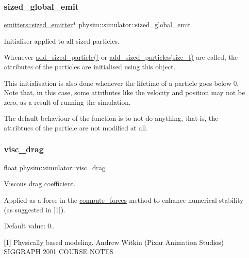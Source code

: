 \subsubsection{\texorpdfstring{sized\+\_\+global\+\_\+emit}{sized\_global\_emit}}
{\footnotesize\ttfamily \hyperlink{classphysim_1_1emitters_1_1sized__emitter}{emitters\+::sized\+\_\+emitter}$\ast$ physim\+::simulator\+::sized\+\_\+global\+\_\+emit\hspace{0.3cm}{\ttfamily [private]}}



Initialiser applied to all sized particles. 

Whenever \hyperlink{classphysim_1_1simulator_ae36d99f98f5e470934eea0523ffca583}{add\+\_\+sized\+\_\+particle()} or \hyperlink{classphysim_1_1simulator_ae0551469d3c6b536da89bce04ff93fee}{add\+\_\+sized\+\_\+particles(size\+\_\+t)} are called, the attributes of the particles are initialised using this object.

This initialisation is also done whenever the lifetime of a particle goes below 0. Note that, in this case, some attributes like the velocity and position may not be zero, as a result of running the simulation.

The default behaviour of the function is to not do anything, that is, the attribtues of the particle are not modified at all. \mbox{\label{classphysim_1_1simulator_a307fe3207801e5497e690facc58fa8f5}} 
\subsubsection{\texorpdfstring{visc\+\_\+drag}{visc\_drag}}
{\footnotesize\ttfamily float physim\+::simulator\+::visc\+\_\+drag\hspace{0.3cm}{\ttfamily [private]}}



Viscous drag coefficient. 

Applied as a force in the \hyperlink{classphysim_1_1simulator_a00c7815358139bf08b2e13fe1ab377bc}{compute\+\_\+forces} method to enhance numerical stability (as suggested in \mbox{[}1\mbox{]}).

Default value\+: 0..

\mbox{[}1\mbox{]} Physically based modeling. Andrew Witkin (Pixar Animation Studios) S\+I\+G\+G\+R\+A\+PH 2001 C\+O\+U\+R\+SE N\+O\+T\+ES 


